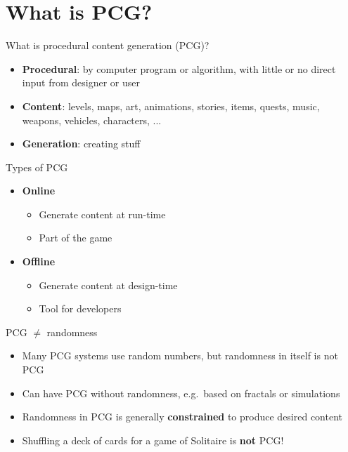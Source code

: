 \part{What is PCG?}
\frame{\partpage}

\begin{frame}{What is procedural content generation (PCG)?}
	\begin{itemize}
		\item<3-> \textbf{Procedural}: by computer program or algorithm,
			with little or no direct input from designer or user
		\item<2-> \textbf{Content}: levels, maps, art, animations, stories, items,
			quests, music, weapons, vehicles, characters, ...
		\item<1-> \textbf{Generation}: creating stuff
	\end{itemize}
\end{frame}

\begin{frame}{Types of PCG}
	\begin{itemize}
		\pause\item \textbf{Online}
			\begin{itemize}
				\pause\item Generate content at run-time
				\pause\item Part of the game
			\end{itemize}
		\pause\item \textbf{Offline}
			\begin{itemize}
				\pause\item Generate content at design-time
				\pause\item Tool for developers
			\end{itemize}
	\end{itemize}
\end{frame}

\begin{frame}{PCG $\neq$ randomness}
	\begin{itemize}
		\pause\item Many PCG systems use random numbers, but randomness in itself is not PCG
		\pause\item Can have PCG without randomness, e.g.\ based on fractals or simulations
		\pause\item Randomness in PCG is generally \textbf{constrained} to produce desired content
		\pause\item Shuffling a deck of cards for a game of Solitaire is \textbf{not} PCG!
	\end{itemize}
\end{frame}

